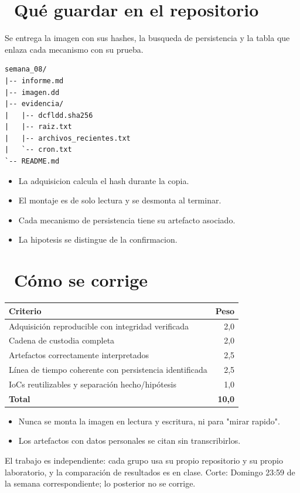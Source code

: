\documentclass[11pt,a4paper]{article}
\newcommand{\iconotexto}[2]{\textcolor{cyanNeon}{\faIcon{#1}}~#2}
\begin{document}
\section{\iconotexto{box-open}{Qué guardar en el repositorio}}

Se entrega la imagen con sus hashes, la busqueda de persistencia y la tabla que enlaza cada mecanismo con su prueba.

\begin{lstlisting}[style=estiloCodigo]
semana_08/
|-- informe.md
|-- imagen.dd
|-- evidencia/
|   |-- dcfldd.sha256
|   |-- raiz.txt
|   |-- archivos_recientes.txt
|   `-- cron.txt
`-- README.md
\end{lstlisting}

\begin{itemize}[leftmargin=1.4em,itemsep=2pt,topsep=3pt]
  \item La adquisicion calcula el hash durante la copia.
  \item El montaje es de solo lectura y se desmonta al terminar.
  \item Cada mecanismo de persistencia tiene su artefacto asociado.
  \item La hipotesis se distingue de la confirmacion.
\end{itemize}

\section{\iconotexto{ruler-combined}{Cómo se corrige}}

\begin{tabularx}{\linewidth}{@{}X r@{}}
\toprule
Criterio & Peso\\
\midrule
Adquisición reproducible con integridad verificada & 2,0 \\
Cadena de custodia completa & 2,0 \\
Artefactos correctamente interpretados & 2,5 \\
Línea de tiempo coherente con persistencia identificada & 2,5 \\
IoCs reutilizables y separación hecho/hipótesis & 1,0 \\
\midrule
\textbf{Total} & \textbf{10,0}\\
\bottomrule
\end{tabularx}

\begin{itemize}[leftmargin=1.4em,itemsep=2pt,topsep=3pt]
  \item Nunca se monta la imagen en lectura y escritura, ni para "mirar rapido".
  \item Los artefactos con datos personales se citan sin transcribirlos.
\end{itemize}

\begin{cajaRecuerda}El trabajo es independiente: cada grupo usa su propio repositorio y su propio laboratorio, y la comparación de resultados es en clase. Corte: Domingo 23:59 de la semana correspondiente; lo posterior no se corrige.
\end{cajaRecuerda}
\end{document}
